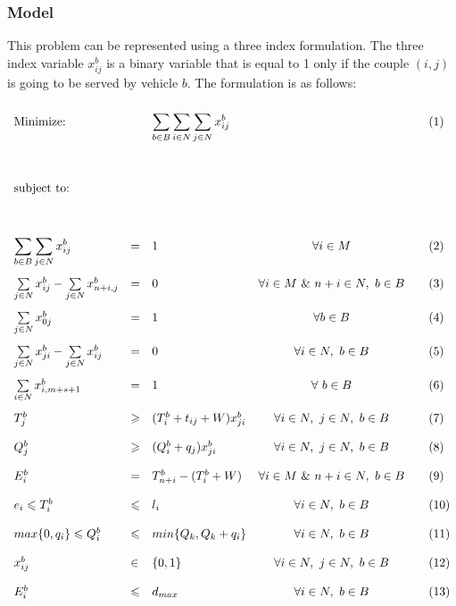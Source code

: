\documentclass{article}
\begin{document}
\subsubsection{Model}
\label{subsection:model}

This problem can be represented using a three index formulation. The three index variable $x_{ij}^{b}$ is a binary variable that is equal to 1 only if the couple  $(i,j)$ is going to be served by vehicle $b$. The formulation is as follows:

\begin{equation*}
\def\arraystretch{2}
\begin{array}{lllcll} %
\text{Minimize:}  && \displaystyle\sum\limits_{b \in B}\sum\limits_{i \in N}\sum\limits_{j \in N}x_{ij}^{b} && & (1)\\
	&	&	&	&	&  \\
\text{subject to:}&   &  &  & &\\
	&	&	& 	&	& \\
	 \displaystyle\sum\limits_{b \in B}\sum\limits_{j \in N}x_{ij}^{b} &=& 1 &  \forall i \in M & & (2) \\ %
	 \sum\limits_{j \in N}x_{ij}^{b} - \sum\limits_{j \in N}x_{n+i, j}^{b} &=& 0	& \forall i \in M \ \& \   n+i \in N, \ b \in B	&&  (3) \\
	 \sum\limits_{j \in N}x_{0j}^{b}&=&1	&\forall b \in B & & (4) \\
	 \sum\limits_{j \in N}x_{ji}^{b} - \sum\limits_{j \in N}x_{ij}^{b} &=& 0	& \forall i \in N, \ b \in B	&&  (5) \\
	 \sum\limits_{i \in N}x_{i,m+s+1}^{b} &=& 1	&	\forall \ b \in B& & (6) \\
	 T^{b}_{j} &\geqslant& ( T^{b}_{i}+t_{ij}+W)x_{ji}^{b} 	& \forall i \in N,\  j \in N, \ b \in B		&&  (7) \\
	 Q^{b}_{j}& \geqslant& ( Q^{b}_{i}+q_j)x_{ji}^{b} 		&\forall i \in N,\  j \in N, \ b \in B		&&  (8) \\
	 E^{b}_{i}	&=&T^{b}_{n+i} -( T^{b}_{i}+W)	&\forall i \in M \ \& \   n+i \in N, \ b \in B		& & (9) \\
	 e_i \leqslant T^{b}_{i}	&\leqslant	&  l_i	&\forall i \in N, \ b \in B	&& (10) \\
	 max\{0,q_i\} \leqslant Q^{b}_{i}&	\leqslant&min\{Q_k, Q_k + q_i\} 	&\forall i \in N, \ b \in B	&& (11) \\
	 x_{ij}^{b} &\in& \{0,1\}	&\forall i \in N,\  j \in N, \ b \in B	& & (12) \\
	 E^{b}_{i} &\leqslant	&  {d}_{max}	&\forall i \in N,\ b \in B	& & (13) \\
\end{array}
\end{equation*}
\end{document}
